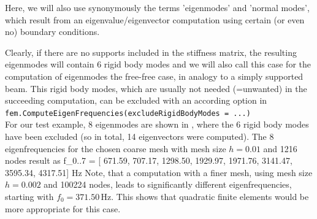 Here, we will also use synonymously the terms 'eigenmodes' and 'normal modes', which result from an eigenvalue/eigenvector computation using certain (or even no) boundary conditions.

Clearly, if there are no supports included in the stiffness matrix, the resulting eigenmodes will contain 6 rigid body modes and we will also call this case for the computation of eigenmodes the free-free case, in analogy to a simply supported beam.
This rigid body modes, which are usually not needed (=unwanted) in the succeeding computation, can be excluded with an according option in \vspace{6pt}\\
\texttt{fem.ComputeEigenFrequencies(excludeRigidBodyModes = ...)}
\vspace{12pt}\\
For our test example, 8 eigenmodes are shown in , where the 6 rigid body modes have been excluded (so in total, 14 eigenvectors were computed).
The 8 eigenfrequencies for the chosen coarse mesh with mesh size $h=0.01$ and 1216 nodes result as 
\be
  f_{0..7} = [ 671.59, 707.17, 1298.50, 1929.97, 1971.76, 3141.47, 3595.34, 4317.51] Hz
\ee
Note, that a computation with a finer mesh, using mesh size $h=0.002$ and 100224 nodes, leads to significantly different eigenfrequencies, starting with $f_0=371.50\,$Hz. This shows that quadratic finite elements would be more appropriate for this case.

